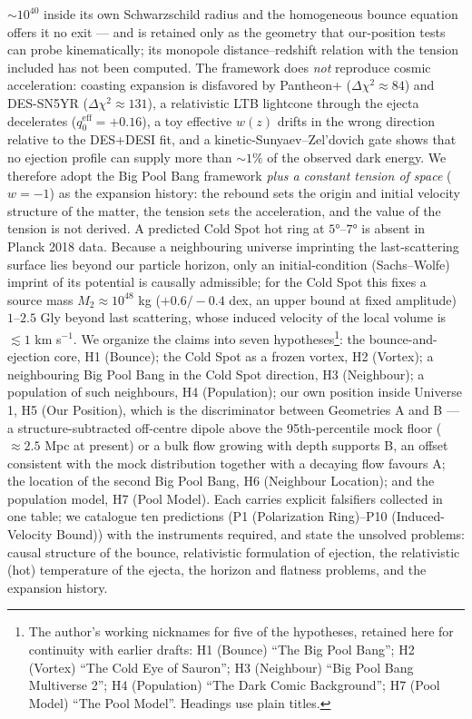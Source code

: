 \documentclass[
]{article}
\begin{document}
\(\sim\!10^{40}\) inside its own Schwarzschild radius and the
homogeneous bounce equation offers it no exit --- and is retained only
as the geometry that our-position tests can probe kinematically; its
monopole distance--redshift relation with the tension included has not
been computed. The framework does \emph{not} reproduce cosmic
acceleration: coasting expansion is disfavored by Pantheon+
(\(\Delta\chi^2 \approx 84\)) and DES-SN5YR
(\(\Delta\chi^2 \approx 131\)), a relativistic LTB lightcone through the
ejecta decelerates (\(q_0^{\text{eff}} = +0.16\)), a toy effective
\(w(z)\) drifts in the wrong direction relative to the DES+DESI fit, and
a kinetic-Sunyaev--Zel'dovich gate shows that no ejection profile can
supply more than \(\sim\!1\%\) of the observed dark energy. We therefore
adopt the Big Pool Bang framework \emph{plus a constant tension of
space} (\(w=-1\)) as the expansion history: the rebound sets the origin
and initial velocity structure of the matter, the tension sets the
acceleration, and the value of the tension is not derived. A predicted
Cold Spot hot ring at \(5°\)--\(7°\) is absent in Planck 2018 data.
Because a neighbouring universe imprinting the last-scattering surface
lies beyond our particle horizon, only an initial-condition
(Sachs--Wolfe) imprint of its potential is causally admissible; for the
Cold Spot this fixes a source mass \(M_2 \approx 10^{48}\) kg
(\(+0.6/-0.4\) dex, an upper bound at fixed amplitude) \(1\)--\(2.5\)
Gly beyond last scattering, whose induced velocity of the local volume
is \(\lesssim 1\) km s\(^{-1}\). We organize the claims into seven
hypotheses\footnote{The author's working nicknames for five of the
  hypotheses, retained here for continuity with earlier drafts: H1
  (Bounce) ``The Big Pool Bang''; H2 (Vortex) ``The Cold Eye of
  Sauron''; H3 (Neighbour) ``Big Pool Bang Multiverse 2''; H4
  (Population) ``The Dark Comic Background''; H7 (Pool Model) ``The Pool
  Model''. Headings use plain titles.}: the bounce-and-ejection core, H1
(Bounce); the Cold Spot as a frozen vortex, H2 (Vortex); a neighbouring
Big Pool Bang in the Cold Spot direction, H3 (Neighbour); a population
of such neighbours, H4 (Population); our own position inside Universe 1,
H5 (Our Position), which is the discriminator between Geometries A and B
--- a structure-subtracted off-centre dipole above the 95th-percentile
mock floor (\(\approx 2.5\) Mpc at present) or a bulk flow growing with
depth supports B, an offset consistent with the mock distribution
together with a decaying flow favours A; the location of the second Big
Pool Bang, H6 (Neighbour Location); and the population model, H7 (Pool
Model). Each carries explicit falsifiers collected in one table; we
catalogue ten predictions (P1 (Polarization Ring)--P10 (Induced-Velocity
Bound)) with the instruments required, and state the unsolved problems:
causal structure of the bounce, relativistic formulation of ejection,
the relativistic (hot) temperature of the ejecta, the horizon and
flatness problems, and the expansion history.
\end{document}
